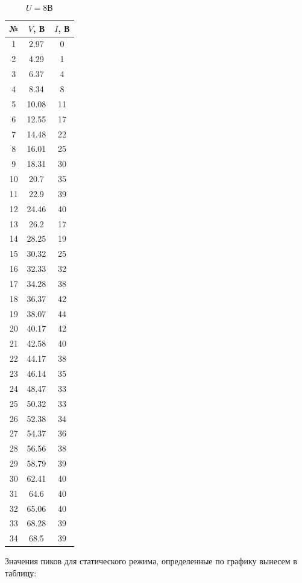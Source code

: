 \documentclass[a4paper, 12pt]{article}
\begin{document}
\begin{table}[!htb]
			\caption{$U=6$В}
		\endminipage\hfill
			\begin{tabular}{|c|c|c|}
			\hline
			№ & $V$, В & $I$, В\\
			\hline
			1 & 2.97 & 0 \\
 			2 & 4.29 & 1 \\
 			3 & 6.37 & 4 \\
 			4 & 8.34 & 8 \\
 			5 & 10.08 & 11 \\
 			6 & 12.55 & 17 \\
 			7 & 14.48 & 22 \\
 			8 & 16.01 & 25 \\
 			9 & 18.31 & 30 \\
 			10 & 20.7 & 35 \\
 			11 & 22.9 & 39 \\
 			12 & 24.46 & 40 \\
 			13 & 26.2 & 17 \\
 			14 & 28.25 & 19 \\
 			15 & 30.32 & 25 \\
 			16 & 32.33 & 32 \\
 			17 & 34.28 & 38 \\
 			18 & 36.37 & 42 \\
 			19 & 38.07 & 44 \\
 			20 & 40.17 & 42 \\
 			21 & 42.58 & 40 \\
 			22 & 44.17 & 38 \\
 			23 & 46.14 & 35 \\
 			24 & 48.47 & 33 \\
 			25 & 50.32 & 33 \\
 			26 & 52.38 & 34 \\
 			27 & 54.37 & 36 \\
 			28 & 56.56 & 38 \\
 			29 & 58.79 & 39 \\
 			30 & 62.41 & 40 \\
 			31 & 64.6 & 40 \\
 			32 & 65.06 & 40 \\
 			33 & 68.28 & 39 \\
 			34 & 68.5 & 39 \\
			\hline
			\end{tabular}
			\caption{$U=8$В}
		\endminipage
	\end{table}
	\newpage
	Значения пиков для статического режима, определенные по графику вынесем в таблицу:
\end{document}
